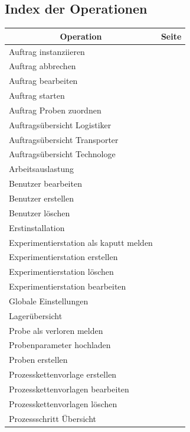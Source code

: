 \documentclass[enabledeprecatedfontcommands,fontsize=12pt,paper=a4,twoside]{scrartcl}
\begin{document}
\subsection{Index der Operationen}
\begin{longtable}[c]{|p{12cm}|p{3cm}|}
\hline
\multicolumn{1}{|c|}{\textbf{Operation}}                          & \multicolumn{1}{c|}{\textbf{Seite}}                                                                                                                                                                                                               \\ \hline
\endhead
Auftrag instanziieren & \\ \hline
Auftrag abbrechen & \\ \hline
Auftrag bearbeiten & \\ \hline
Auftrag starten  & \\ \hline
Auftrag Proben zuordnen & \\ \hline
Auftragsübersicht Logistiker & \\ \hline
Auftragsübersicht Transporter & \\ \hline
Auftragsübersicht Technologe & \\ \hline
Arbeitsauslastung  & \\ \hline
Benutzer bearbeiten & \\ \hline
Benutzer erstellen & \\ \hline
Benutzer löschen & \\ \hline
Erstinstallation & \\ \hline
Experimentierstation als kaputt melden & \\ \hline
Experimentierstation erstellen & \\ \hline
Experimentierstation löschen & \\ \hline
Experimentierstation bearbeiten & \\ \hline
Globale Einstellungen & \\ \hline
Lagerübersicht & \\ \hline
Probe als verloren melden & \\ \hline
Probenparameter hochladen  & \\ \hline
Proben erstellen  & \\ \hline
Prozesskettenvorlage erstellen & \\ \hline
Prozesskettenvorlagen bearbeiten & \\ \hline
Prozesskettenvorlagen löschen & \\ \hline
Prozessschritt Übersicht & \\ \hline

\end{longtable}
\end{document}
